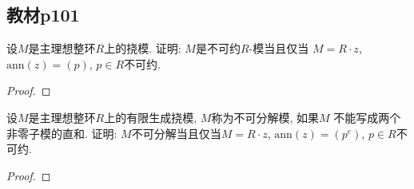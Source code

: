 \subsection{教材p101}

\begin{problem}
    设$M$是主理想整环$R$上的挠模. 证明: $M$是不可约$R$-模当且仅当
$M = R \cdot z$, $\mathrm{ann}(z) = (p)$, $p \in R$不可约.
\end{problem}

\begin{proof}
    
\end{proof}

\begin{problem}
    设$M$是主理想整环$R$上的有限生成挠模, $M$称为不可分解模, 如果$M$
不能写成两个非零子模的直和. 证明: $M$不可分解当且仅当$M = R \cdot z$,
$\mathrm{ann}(z) = (p^e)$, $p \in R$不可约.
\end{problem}

\begin{proof}
    
\end{proof}